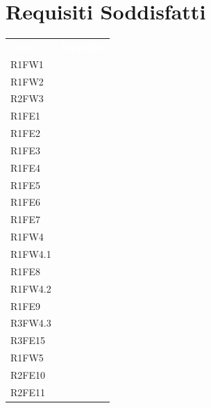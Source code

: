 \section{Requisiti Soddisfatti}

\begin{table}[!htbp]
\renewcommand{\arraystretch}{1.5}
\begin{tabular}[t]{ m{}<{\centering}  m{}<{\centering} }
	\rowcolor{darkblue}
	\textcolor{white}{\textbf{Fonte}} &\textcolor{white}{\textbf{Requisiti}}\\ 

	R1FW1 & \So \\	
	 
	R1FW2 & \So \\	

	R2FW3 & \So \\	
	 
	R1FE1 & \So \\	
	 
	R1FE2 & \So \\	
	 
	R1FE3 & \So \\	

	R1FE4 & \So \\	
	
	R1FE5 & \So \\
	 
	R1FE6 & \So \\	 
	 
	R1FE7 & \So \\	

	R1FW4 & \So \\ 
	 
	R1FW4.1& \Ns \\	
	 
	R1FE8 & \Ns \\	
	 
	R1FW4.2 & \Ns \\		 

	R1FE9 & \Ns \\		
	 
	R3FW4.3 & \So \\				
	 
	R3FE15 & \So \\			
	  	 	 	
	R1FW5 & \So \\		
	
	R2FE10 & \Ns \\
	
	R2FE11 & \Ns \\
	 

\end{tabular}
\end{table}
